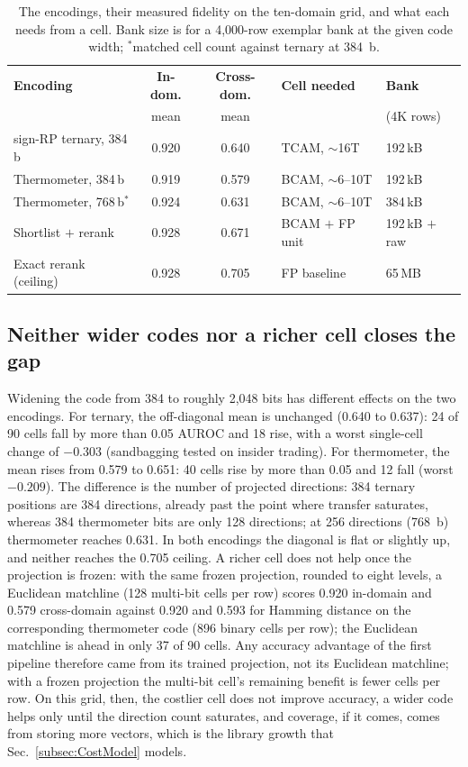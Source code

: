\documentclass[conference]{IEEEtran}
\newcommand{\tcam}{{TCAM}\xspace}
\newcommand{\auroc}{{AUROC}\xspace}
\newcommand{\signrp}{{sign-RP}\xspace}
\begin{document}
\begin{table}[t]
\centering
\caption{The encodings, their measured fidelity on the ten-domain
grid, and what each needs from a cell. Bank size is for a
4{,}000-row exemplar bank at the given code width; $^{*}$matched
cell count against ternary at 384~b.}
\label{tab:encodings}
{\scriptsize\setlength{\tabcolsep}{3.5pt}
\begin{tabular}{@{}lccll@{}}
\toprule
\textbf{Encoding} & \textbf{In-dom.} & \textbf{Cross-dom.} &
\textbf{Cell needed} & \textbf{Bank} \\
 & mean & mean & & (4K rows) \\
\midrule
\signrp ternary, 384\,b       & 0.920 & 0.640 & \tcam, $\sim$16T   & 192\,kB \\
Thermometer, 384\,b           & 0.919 & 0.579 & BCAM, $\sim$6--10T & 192\,kB \\
Thermometer, 768\,b$^{*}$          & 0.924 & 0.631 & BCAM, $\sim$6--10T & 384\,kB \\
Shortlist $+$ rerank          & 0.928 & 0.671 & BCAM $+$ FP unit   & 192\,kB $+$ raw \\
Exact rerank (ceiling)        & 0.928 & 0.705 & FP baseline        & 65\,MB \\
\bottomrule
\end{tabular}}
\end{table}

\subsection{Neither wider codes nor a richer cell closes the gap}
\label{subsec:BitWidth}
Widening the code from 384 to roughly 2{,}048 bits has different
effects on the two encodings. For ternary, the off-diagonal mean is
unchanged (0.640 to 0.637): 24 of 90 cells fall by more than 0.05
\auroc and 18 rise, with a worst single-cell change of $-0.303$
(sandbagging tested on insider trading). For thermometer, the mean
rises from 0.579 to 0.651: 40 cells rise by more than 0.05 and 12
fall (worst $-0.209$). The difference is the number of projected
directions: 384 ternary positions are 384 directions, already past
the point where transfer saturates, whereas 384 thermometer bits are
only 128 directions; at 256 directions (768~b) thermometer reaches
0.631. In both encodings the diagonal is flat or slightly up, and
neither reaches the 0.705 ceiling. A
richer cell does not help once the projection is frozen: with
the same frozen projection, rounded to eight levels, a Euclidean
matchline (128 multi-bit cells per row)
scores 0.920 in-domain and 0.579 cross-domain against 0.920 and 0.593
for Hamming distance on the corresponding thermometer code (896
binary cells per row); the Euclidean matchline is ahead in only 37
of 90 cells. Any accuracy
advantage of the first pipeline therefore came from its trained
projection, not its Euclidean matchline; with a frozen projection the multi-bit cell's
remaining benefit is fewer cells per row. On this grid, then, the
costlier cell does not improve accuracy, a wider code helps only
until the direction count saturates, and coverage, if it comes, comes
from storing more vectors, which is the library growth that Sec.~\ref{subsec:CostModel} models.
\end{document}
